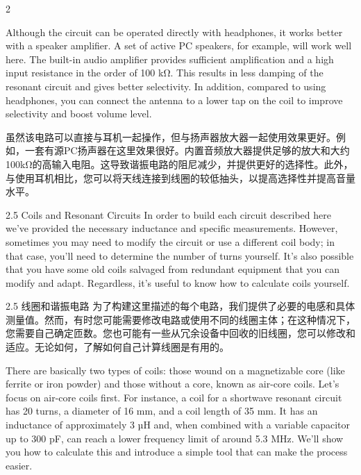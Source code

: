 \documentclass{ctexbook}
\begin{document}
\begin{paracol}{2}
\switchcolumn*

Although the circuit can be operated directly with headphones, it works better with a speaker amplifier. A set of active PC speakers, for example, will work well here. The built-in 
audio amplifier provides sufficient amplification and a high input resistance in the order of 
100 kΩ. This results in less damping of the resonant circuit and gives better selectivity. In 
addition, compared to using headphones, you can connect the antenna to a lower tap on 
the coil to improve selectivity and boost volume level.

\switchcolumn

虽然该电路可以直接与耳机一起操作，但与扬声器放大器一起使用效果更好。例如，一套有源PC扬声器在这里效果很好。内置音频放大器提供足够的放大和大约100kΩ的高输入电阻。这导致谐振电路的阻尼减少，并提供更好的选择性。此外，与使用耳机相比，您可以将天线连接到线圈的较低抽头，以提高选择性并提高音量水平。

\switchcolumn*

2.5 Coils and Resonant Circuits 
In order to build each circuit described here we've provided the necessary inductance and 
specific measurements. However, sometimes you may need to modify the circuit or use a 
different coil body; in that case, you'll need to determine the number of turns yourself. It's 
also possible that you have some old coils salvaged from redundant equipment that you can 
modify and adapt. Regardless, it's useful to know how to calculate coils yourself. 

\switchcolumn

2.5 线圈和谐振电路
为了构建这里描述的每个电路，我们提供了必要的电感和具体测量值。然而，有时您可能需要修改电路或使用不同的线圈主体；在这种情况下，您需要自己确定匝数。您也可能有一些从冗余设备中回收的旧线圈，您可以修改和适应。无论如何，了解如何自己计算线圈是有用的。

\switchcolumn*

There are basically two types of coils: those wound on a magnetizable core (like ferrite 
or iron powder) and those without a core, known as air-core coils. Let's focus on air-core 
coils first. For instance, a coil for a shortwave resonant circuit has 20 turns, a diameter 
of 16 mm, and a coil length of 35 mm. It has an inductance of approximately 3 µH and, 
when combined with a variable capacitor up to 300 pF, can reach a lower frequency limit of 
around 5.3 MHz. We'll show you how to calculate this and introduce a simple tool that can 
make the process easier. 


\end{paracol}
\end{document}
